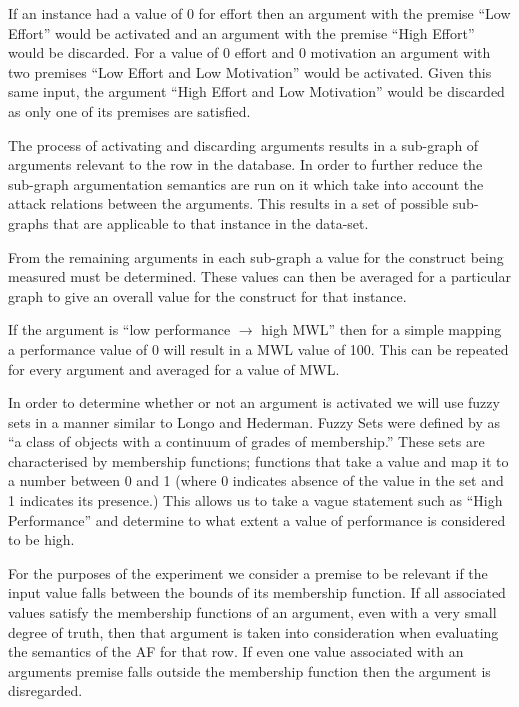 \begin{exmp}
If an instance had a value of 0 for effort then an argument with the premise ``Low Effort'' would be activated and an argument with the premise ``High Effort'' would be discarded. For a value of 0 effort and 0 motivation an argument with two premises ``Low Effort and Low Motivation'' would be activated. Given this same input, the argument ``High Effort and Low Motivation'' would be discarded as only one of its premises are satisfied.
\end{exmp}

The process of activating and discarding arguments results in a sub-graph of arguments relevant to the row in the database. In order to further reduce the sub-graph argumentation semantics are run on it which take into account the attack relations between the arguments. This results in a set of possible sub-graphs that are applicable to that instance in the data-set.

From the remaining arguments in each sub-graph a value for the construct being measured must be determined. These values can then be averaged for a particular graph to give an overall value for the construct for that instance. 

\begin{exmp}
If the argument is ``low performance $\rightarrow$ high MWL'' then for a simple mapping a performance value of 0 will result in a MWL value of 100. This can be repeated for every argument and averaged for a value of MWL.
\end{exmp}

In order to determine whether or not an argument is activated we will use fuzzy sets in a manner similar to Longo and Hederman. Fuzzy Sets were defined by \cite{zadeh1965fuzzy} as ``a class of objects with a continuum of grades of membership.'' These sets are characterised by membership functions; functions that take a value and map it to a number between 0 and 1 (where 0 indicates absence of the value in the set and 1 indicates its presence.) This allows us to take a vague statement such as ``High Performance'' and determine to what extent a value of performance is considered to be high. 

For the purposes of the experiment we consider a premise to be relevant if the input value falls between the bounds of its membership function. If all associated values satisfy the membership functions of an argument, even with a very small degree of truth, then that argument is taken into consideration when evaluating the semantics of the AF for that row. If even one value associated with an arguments premise falls outside the membership function then the argument is disregarded.

